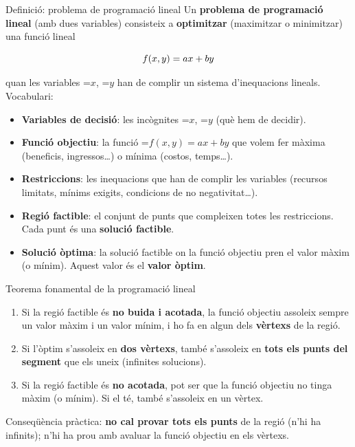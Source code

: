 \documentclass[11pt,a4paper]{article}
\newcommand{\fmm}[1]{\setbox0=\hbox{$#1$}\ifdim\wd0>\linewidth\fmdisp{#1}\else\mbox{\box0}\fi}
\newcommand{\fmdisp}[1]{\[\setbox2=\hbox{$\displaystyle #1$}\ifdim\wd2>\linewidth\resizebox{\linewidth}{!}{\box2}\else\box2\fi\]}
\begin{document}
\begin{fmdef}{Definició: problema de programació lineal}
Un \textbf{problema de programació lineal} (amb dues variables) consisteix a \textbf{optimitzar} (maximitzar o minimitzar) una funció lineal

\fmdisp{f(x,y)=ax+by}

quan les variables \fmm{x}, \fmm{y} han de complir un sistema d'inequacions lineals. Vocabulari:

\begin{itemize}
\item \textbf{Variables de decisió}: les incògnites \fmm{x}, \fmm{y} (què hem de decidir).
\item \textbf{Funció objectiu}: la funció \fmm{f(x,y)=ax+by} que volem fer màxima (beneficis, ingressos\dots{}) o mínima (costos, temps\dots{}).
\item \textbf{Restriccions}: les inequacions que han de complir les variables (recursos limitats, mínims exigits, condicions de no negativitat\dots{}).
\item \textbf{Regió factible}: el conjunt de punts que compleixen totes les restriccions. Cada punt és una \textbf{solució factible}.
\item \textbf{Solució òptima}: la solució factible on la funció objectiu pren el valor màxim (o mínim). Aquest valor és el \textbf{valor òptim}.
\end{itemize}
\end{fmdef}

\begin{fmprop}{Teorema fonamental de la programació lineal}
\begin{enumerate}
\item Si la regió factible és \textbf{no buida i acotada}, la funció objectiu assoleix sempre un valor màxim i un valor mínim, i ho fa en algun dels \textbf{vèrtexs} de la regió.
\item Si l'òptim s'assoleix en \textbf{dos vèrtexs}, també s'assoleix en \textbf{tots els punts del segment} que els uneix (infinites solucions).
\item Si la regió factible és \textbf{no acotada}, pot ser que la funció objectiu no tinga màxim (o mínim). Si el té, també s'assoleix en un vèrtex.
\end{enumerate}

\begin{fmnote}Conseqüència pràctica: \textbf{no cal provar tots els punts} de la regió (n'hi ha infinits); n'hi ha prou amb avaluar la funció objectiu en els vèrtexs.\end{fmnote}
\end{fmprop}
\end{document}
